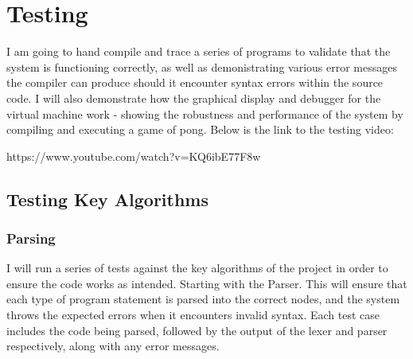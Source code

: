 \section{Testing}
I am going to hand compile and trace a series of programs to validate that the system is functioning correctly, as well as demonistrating various error messages the compiler can produce should it encounter syntax errors within the source code. I will also demonstrate how the graphical display and debugger for the virtual machine work - showing the robustness and performance of the system by compiling and executing a game of pong. Below is the link to the testing video:

https://www.youtube.com/watch?v=KQ6ibE77F8w

 

\subsection{Testing Key Algorithms}

\subsubsection{Parsing}
I will run a series of tests against the key algorithms of the project in order to ensure the code works as intended. Starting with the Parser. This will ensure that each type of program statement is parsed into the correct nodes, and the system throws the expected errors when it encounters invalid syntax. Each test case includes the code being parsed, followed by the output of the lexer and parser respectively, along with any error messages.


